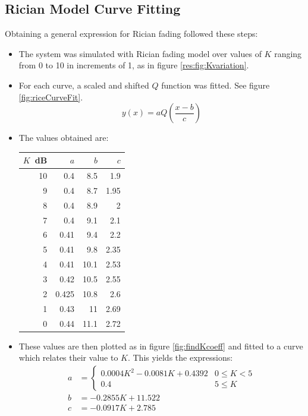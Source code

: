 \subsection{Rician Model Curve Fitting}
Obtaining a general expression for Rician fading followed these steps:
\begin{itemize}
	\item The system was simulated with Rician fading model over values of \(K\) ranging from 0 to 10 in increments of 1, as in figure \ref{res:fig:Kvariation}.
	\item For each curve, a scaled and shifted \(Q\) function was fitted. See figure \ref{fig:riceCurveFit}.
		\[
			y(x) = aQ\left(\frac{x - b}{c}\right)
		\]
		\begin{mathDef}
		\end{mathDef}
	\item The values obtained are:
		\begin{center}
			\begin{tabular}{r r r r}
				\(K\)~dB & \(a\) & \(b\) & \(c\) \\
				\hline
				10 & 0.4 & 8.5 & 1.9 \\
				9 & 0.4 & 8.7 & 1.95 \\
				8 & 0.4 & 8.9 & 2 \\
				7 & 0.4 & 9.1 & 2.1 \\
				6 & 0.41 & 9.4 & 2.2 \\
				5 & 0.41 & 9.8 & 2.35 \\
				4 & 0.41 & 10.1 & 2.53 \\
				3 & 0.42 & 10.5 & 2.55 \\
				2 & 0.425 & 10.8 & 2.6 \\
				1 & 0.43 & 11 & 2.69 \\
				0 & 0.44 & 11.1 & 2.72
			\end{tabular}
		\end{center}
	\item These values are then plotted as in figure \ref{fig:findKcoeff} and fitted to a curve which relates their value to \(K\). This yields the expressions:
		\begin{align*}
			a &= \begin{cases}0.0004K^2 - 0.0081K + 0.4392 & 0 \leq K < 5\\0.4 & 5 \leq K\end{cases}\\
			b &= -0.2855K + 11.522\\
			c &= -0.0917K + 2.785
		\end{align*}
\end{itemize}
